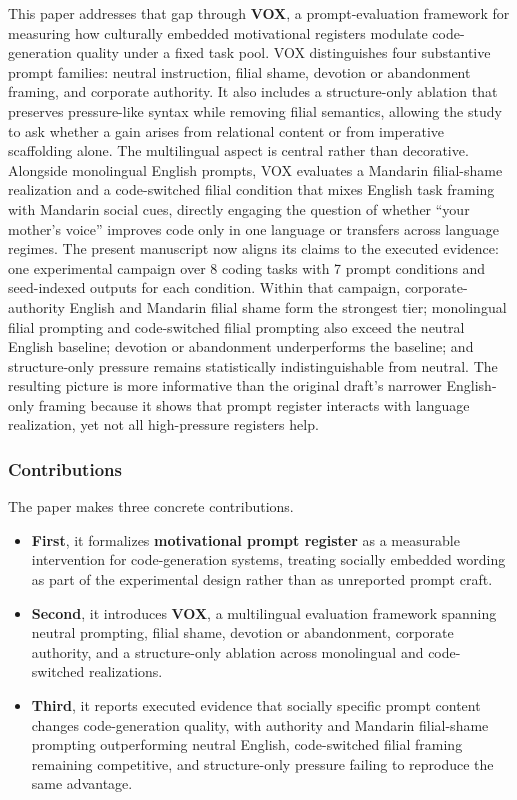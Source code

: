 \documentclass{article}
\begin{document}
This paper addresses that gap through \textbf{VOX}, a prompt-evaluation framework for measuring how culturally embedded motivational registers modulate code-generation quality under a fixed task pool. VOX distinguishes four substantive prompt families: neutral instruction, filial shame, devotion or abandonment framing, and corporate authority. It also includes a structure-only ablation that preserves pressure-like syntax while removing filial semantics, allowing the study to ask whether a gain arises from relational content or from imperative scaffolding alone. The multilingual aspect is central rather than decorative. Alongside monolingual English prompts, VOX evaluates a Mandarin filial-shame realization and a code-switched filial condition that mixes English task framing with Mandarin social cues, directly engaging the question of whether ``your mother's voice'' improves code only in one language or transfers across language regimes. The present manuscript now aligns its claims to the executed evidence: one experimental campaign over 8 coding tasks with 7 prompt conditions and seed-indexed outputs for each condition. Within that campaign, corporate-authority English and Mandarin filial shame form the strongest tier; monolingual filial prompting and code-switched filial prompting also exceed the neutral English baseline; devotion or abandonment underperforms the baseline; and structure-only pressure remains statistically indistinguishable from neutral. The resulting picture is more informative than the original draft's narrower English-only framing because it shows that prompt register interacts with language realization, yet not all high-pressure registers help.

\subsubsection{Contributions}

\label{sec:contributions}

The paper makes three concrete contributions.

\begin{itemize}
 \item \textbf{First}, it formalizes \textbf{motivational prompt register} as a measurable intervention for code-generation systems, treating socially embedded wording as part of the experimental design rather than as unreported prompt craft.
 \item \textbf{Second}, it introduces \textbf{VOX}, a multilingual evaluation framework spanning neutral prompting, filial shame, devotion or abandonment, corporate authority, and a structure-only ablation across monolingual and code-switched realizations.
 \item \textbf{Third}, it reports executed evidence that socially specific prompt content changes code-generation quality, with authority and Mandarin filial-shame prompting outperforming neutral English, code-switched filial framing remaining competitive, and structure-only pressure failing to reproduce the same advantage.
\end{itemize}
\end{document}
